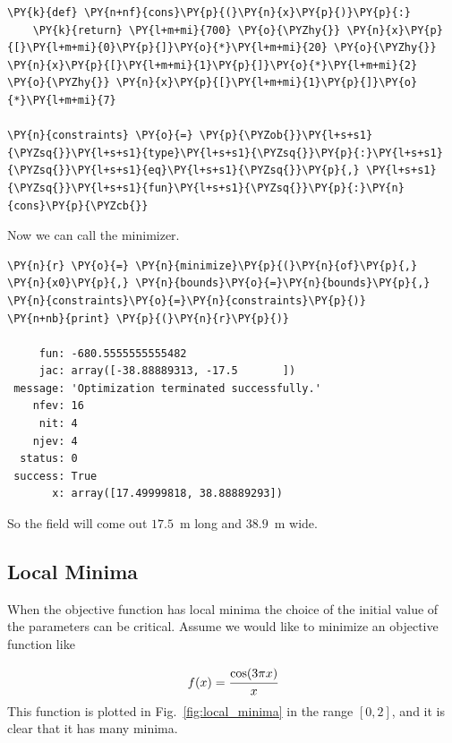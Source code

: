 \begin{tcolorbox}[breakable, size=fbox, boxrule=1pt, pad at break*=1mm,colback=cellbackground, colframe=cellborder]
\begin{Verbatim}[commandchars=\\\{\}]
\PY{k}{def} \PY{n+nf}{cons}\PY{p}{(}\PY{n}{x}\PY{p}{)}\PY{p}{:}
    \PY{k}{return} \PY{l+m+mi}{700} \PY{o}{\PYZhy{}} \PY{n}{x}\PY{p}{[}\PY{l+m+mi}{0}\PY{p}{]}\PY{o}{*}\PY{l+m+mi}{20} \PY{o}{\PYZhy{}} \PY{n}{x}\PY{p}{[}\PY{l+m+mi}{1}\PY{p}{]}\PY{o}{*}\PY{l+m+mi}{2} \PY{o}{\PYZhy{}} \PY{n}{x}\PY{p}{[}\PY{l+m+mi}{1}\PY{p}{]}\PY{o}{*}\PY{l+m+mi}{7}

\PY{n}{constraints} \PY{o}{=} \PY{p}{\PYZob{}}\PY{l+s+s1}{\PYZsq{}}\PY{l+s+s1}{type}\PY{l+s+s1}{\PYZsq{}}\PY{p}{:}\PY{l+s+s1}{\PYZsq{}}\PY{l+s+s1}{eq}\PY{l+s+s1}{\PYZsq{}}\PY{p}{,} \PY{l+s+s1}{\PYZsq{}}\PY{l+s+s1}{fun}\PY{l+s+s1}{\PYZsq{}}\PY{p}{:}\PY{n}{cons}\PY{p}{\PYZcb{}}
\end{Verbatim}
\end{tcolorbox}
Now we can call the minimizer.

\begin{tcolorbox}[breakable, size=fbox, boxrule=1pt, pad at break*=1mm,colback=cellbackground, colframe=cellborder]
\begin{Verbatim}[commandchars=\\\{\}]
\PY{n}{r} \PY{o}{=} \PY{n}{minimize}\PY{p}{(}\PY{n}{of}\PY{p}{,} \PY{n}{x0}\PY{p}{,} \PY{n}{bounds}\PY{o}{=}\PY{n}{bounds}\PY{p}{,} \PY{n}{constraints}\PY{o}{=}\PY{n}{constraints}\PY{p}{)}
\PY{n+nb}{print} \PY{p}{(}\PY{n}{r}\PY{p}{)}

     fun: -680.5555555555482
     jac: array([-38.88889313, -17.5       ])
 message: 'Optimization terminated successfully.'
    nfev: 16
     nit: 4
    njev: 4
  status: 0
 success: True
       x: array([17.49999818, 38.88889293])
    \end{Verbatim}
\end{tcolorbox}

So the field will come out \(17.5\)~m long and \(38.9\)~m wide.

\subsection{Local Minima}
When the objective function has local minima the choice of the initial value of the parameters can be critical. 
Assume we would like to minimize an objective function like 

\[
f(x) = \cfrac{\mathrm{cos}(3\pi x)}{x}
\]
This function is plotted in Fig.~\ref{fig:local_minima} in the range $[0, 2]$, and it is clear that it has many minima. 

